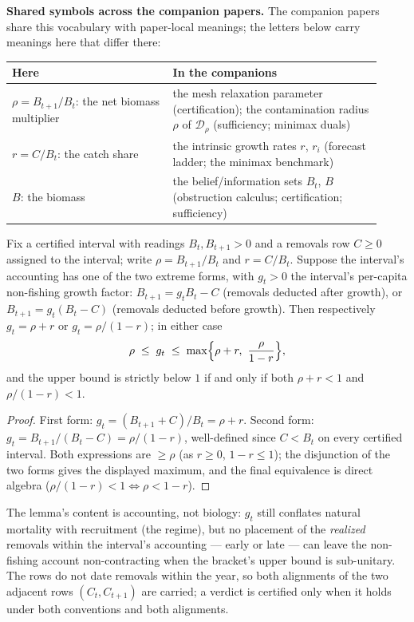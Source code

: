 \medskip
\noindent\textbf{Shared symbols across the companion papers.} The
companion papers share this vocabulary with paper-local meanings; the
letters below carry meanings here that differ there:
\begin{center}\small
\begin{tabular}{@{}p{0.40\linewidth}p{0.52\linewidth}@{}}
\toprule
\textbf{Here} & \textbf{In the companions} \\
\midrule
\(\rho = B_{t+1}/B_t\): the net biomass multiplier &
the mesh relaxation parameter (certification); the contamination radius
\(\rho\) of \(\mathcal{D}_{\rho}\) (sufficiency; minimax duals) \\
\(r = C/B_t\): the catch share &
the intrinsic growth rates \(r\), \(r_{i}\) (forecast ladder; the
minimax benchmark) \\
\(B\): the biomass &
the belief/information sets \(B_t\), \(B\) (obstruction calculus;
certification; sufficiency) \\
\bottomrule
\end{tabular}
\end{center}

\begin{lemma}\label{regime-lem:bracket}
Fix a certified interval with readings \(B_t, B_{t+1} > 0\) and a
removals row \(C \ge 0\) assigned to the interval; write
\(\rho = B_{t+1}/B_t\) and \(r = C/B_t\). Suppose the interval's
accounting has one of the two extreme forms, with \(g_t > 0\) the
interval's per-capita non-fishing growth factor:
\(B_{t+1} = g_t B_t - C\) (removals deducted after growth), or
\(B_{t+1} = g_t (B_t - C)\) (removals deducted before growth). Then
respectively \(g_t = \rho + r\) or \(g_t = \rho/(1-r)\); in either
case
\[
\rho \;\le\; g_t \;\le\; \max\Bigl\{\rho + r,\ \frac{\rho}{1-r}\Bigr\},
\]
and the upper bound is strictly below \(1\) if and only if both
\(\rho + r < 1\) and \(\rho/(1-r) < 1\).
\end{lemma}

\begin{proof}
First form: \(g_t = (B_{t+1} + C)/B_t = \rho + r\). Second form:
\(g_t = B_{t+1}/(B_t - C) = \rho/(1 - r)\), well-defined since
\(C < B_t\) on every certified interval. Both expressions are
\(\ge \rho\) (as \(r \ge 0\), \(1 - r \le 1\)); the disjunction of the
two forms gives the displayed maximum, and the final equivalence is
direct algebra (\(\rho/(1-r) < 1 \iff \rho < 1 - r\)).
\end{proof}

The lemma's content is accounting, not biology: \(g_t\) still conflates
natural mortality with recruitment (the regime), but no placement of
the \emph{realized} removals within the interval's accounting --- early
or late --- can leave the non-fishing account non-contracting when the
bracket's upper bound is sub-unitary. The rows do not date removals
within the year, so both alignments of the two adjacent rows
\((C_t, C_{t+1})\) are carried; a verdict is certified only when it
holds under both conventions and both alignments.

